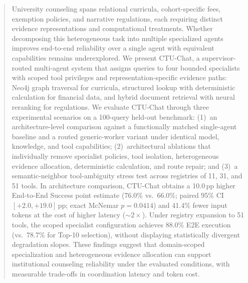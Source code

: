 \begin{abstract}
University counseling spans relational curricula, cohort-specific fees, exemption policies, and narrative regulations, each requiring distinct evidence representations and computational treatments. Whether decomposing this heterogeneous task into multiple specialized agents improves end-to-end reliability over a single agent with equivalent capabilities remains underexplored. We present CTU-Chat, a supervisor-routed multi-agent system that assigns queries to four bounded specialists with scoped tool privileges and representation-specific evidence paths: Neo4j graph traversal for curricula, structured lookup with deterministic calculation for financial data, and hybrid document retrieval with neural reranking for regulations. We evaluate CTU-Chat through three experimental scenarios on a 100-query held-out benchmark: (1)~an architecture-level comparison against a functionally matched single-agent baseline and a routed generic-worker variant under identical model, knowledge, and tool capabilities; (2)~architectural ablations that individually remove specialist policies, tool isolation, heterogeneous evidence allocation, deterministic calculation, and route repair; and (3)~a semantic-neighbor tool-ambiguity stress test across registries of 11, 31, and 51 tools. In architecture comparison, CTU-Chat obtains a 10.0\,pp higher End-to-End Success point estimate (76.0\% vs.\ 66.0\%; paired 95\% CI $[+2.0, +19.0]$\,pp; exact McNemar $p{=}0.0414$) and 41.4\% fewer input tokens at the cost of higher latency ($\sim 2\times$). Under registry expansion to 51 tools, the scoped specialist configuration achieves 88.0\% E2E execution (vs.\ 78.7\% for Top-10 selection), without displaying statistically divergent degradation slopes. These findings suggest that domain-scoped specialization and heterogeneous evidence allocation can support institutional counseling reliability under the evaluated conditions, with measurable trade-offs in coordination latency and token cost.

\end{abstract}
